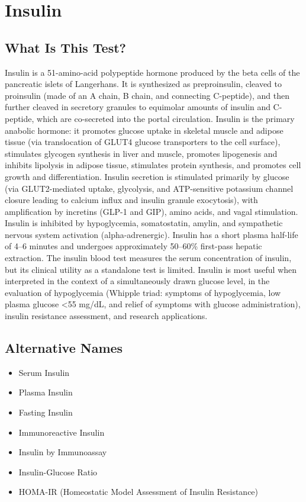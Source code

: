 \chapter{Insulin}

\section*{What Is This Test?}
Insulin is a 51-amino-acid polypeptide hormone produced by the beta cells of the pancreatic islets of Langerhans. It is synthesized as preproinsulin, cleaved to proinsulin (made of an A chain, B chain, and connecting C-peptide), and then further cleaved in secretory granules to equimolar amounts of insulin and C-peptide, which are co-secreted into the portal circulation. Insulin is the primary anabolic hormone: it promotes glucose uptake in skeletal muscle and adipose tissue (via translocation of GLUT4 glucose transporters to the cell surface), stimulates glycogen synthesis in liver and muscle, promotes lipogenesis and inhibits lipolysis in adipose tissue, stimulates protein synthesis, and promotes cell growth and differentiation. Insulin secretion is stimulated primarily by glucose (via GLUT2-mediated uptake, glycolysis, and ATP-sensitive potassium channel closure leading to calcium influx and insulin granule exocytosis), with amplification by incretins (GLP-1 and GIP), amino acids, and vagal stimulation. Insulin is inhibited by hypoglycemia, somatostatin, amylin, and sympathetic nervous system activation (alpha-adrenergic). Insulin has a short plasma half-life of 4--6 minutes and undergoes approximately 50--60\% first-pass hepatic extraction. The insulin blood test measures the serum concentration of insulin, but its clinical utility as a standalone test is limited. Insulin is most useful when interpreted in the context of a simultaneously drawn glucose level, in the evaluation of hypoglycemia (Whipple triad: symptoms of hypoglycemia, low plasma glucose <55 mg/dL, and relief of symptoms with glucose administration), insulin resistance assessment, and research applications.

\section*{Alternative Names}
\begin{itemize}
  \item Serum Insulin
  \item Plasma Insulin
  \item Fasting Insulin
  \item Immunoreactive Insulin
  \item Insulin by Immunoassay
  \item Insulin-Glucose Ratio
  \item HOMA-IR (Homeostatic Model Assessment of Insulin Resistance)
\end{itemize}
